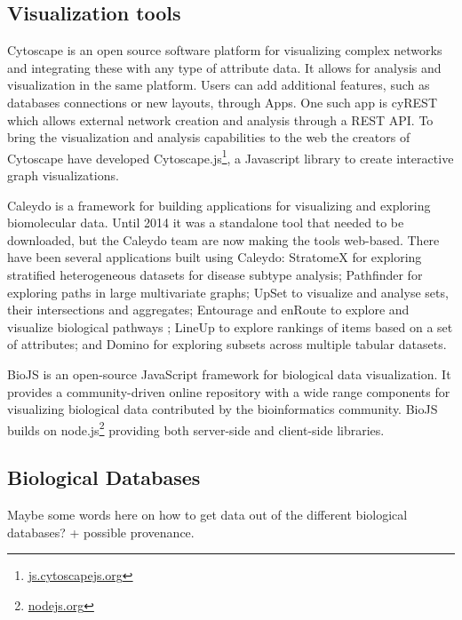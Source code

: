 \subsection*{Visualization tools} 
Cytoscape is an open source software platform for visualizing complex
networks and integrating these with any type of attribute
data\cite{shannon2003cytoscape}. It allows for analysis and visualization in the
same platform. Users can add additional features, such as databases connections
or new layouts, through Apps. One such app is cyREST which allows external
network creation and analysis through a REST API\cite{ono2015cyrest}.  To bring
the visualization and analysis capabilities to the web the creators of Cytoscape
have developed Cytoscape.js\footnote{\url{js.cytoscapejs.org}}, a Javascript
library to create interactive graph visualizations. 

Caleydo is a framework for building applications for visualizing and exploring
biomolecular data\cite{cleydo}. Until 2014 it was a standalone tool that needed
to be downloaded, but the Caleydo team are now making the tools web-based. There
have been several applications built using Caleydo: StratomeX for exploring
stratified heterogeneous datasets for disease subtype analysis\cite{stratomex};
Pathfinder for exploring paths in large multivariate graphs\cite{pathfinder};
UpSet to visualize and analyse sets, their intersections and
aggregates\cite{upset}; Entourage and enRoute to explore and visualize
biological pathways \cite{entourage}\cite{enroute}; LineUp to explore rankings
of items based on a set of attributes\cite{lineup}; and Domino for exploring
subsets across multiple tabular datasets\cite{domino}. 

BioJS is an open-source JavaScript framework for biological data
visualization.\cite{gomez2013biojs} It provides a community-driven online
repository with a wide range components for visualizing biological data
contributed by the bioinformatics community. BioJS builds on
node.js\footnote{\url{nodejs.org}} providing both server-side and client-side
libraries. 


\subsection*{Biological Databases} 
Maybe some words here on how to get data out of the different biological
databases? + possible provenance. 


